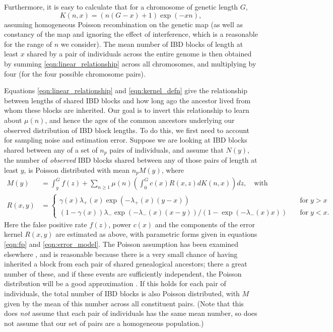 \documentclass{article}
\begin{document}
Furthermore, it is easy to calculate that for a chromosome of genetic length $G$, 
\begin{equation} \label{eqn:kernel_defn}
   K(n,x) = \left( n(G-x) + 1\right)\exp(-xn) ,
\end{equation}
assuming homogeneous Poisson recombination on the genetic map 
(as well as constancy of the map and ignoring the effect of interference, which is a reasonable for the range of $n$ we consider).
The mean number of IBD blocks of length at least $x$ shared by a pair of individuals
across the entire genome is then obtained by summing \eqref{eqn:linear_relationship} across all chromosomes,
and multiplying by four (for the four possible chromosome pairs).


Equations \eqref{eqn:linear_relationship} and \eqref{eqn:kernel_defn} give the relationship between lengths of shared IBD blocks 
and how long ago the ancestor lived from whom these blocks are inherited. 
Our goal is to invert this relationship to learn about $\mu(n)$,
and hence the ages of the common ancestors underlying our observed distribution of IBD block lengths.
To do this, 
we first need to account for sampling noise and estimation error.
Suppose we are looking at IBD blocks shared between any of a set of $n_p$ pairs of individuals,
and assume that $N(y)$, the number of {\em observed} IBD blocks shared between any of those pairs of length at least $y$, 
is Poisson distributed with mean $n_p M(y)$,
where
\begin{align} 
  M(y) &= \int_y^G f(z) + \sum_{n\ge1} \mu(n)  \left( \int_0^G c(x)R(x,z) dK(n,x) \right) dz , \quad \mbox{with}\label{eqn:error_relationship} \\
  R(x,y) &= \begin{cases} \gamma(x) \lambda_+(x) \exp(-\lambda_+(x) (y-x)) \quad &\mbox{for} \; y>x \\
    (1-\gamma(x)) \lambda_-\exp(-\lambda_-(x) (x-y)) / (1-\exp(-\lambda_-(x) x)) \quad &\mbox{for} \; y<x .  \end{cases} 
\end{align}
Here the false positive rate $f(z)$, power $c(x)$ and the components of the error kernel $R(x,y)$ are estimated as above,
with parametric forms given in equations \eqref{eqn:fp} and \eqref{eqn:error_model}.
The Poisson assumption has been examined elsewhere \citep[e.g.][]{fisher1954fuller,huff2011maximumlikelihood},
and is reasonable
because there is a very small chance of having inherited a block from each pair of shared genealogical ancestors;
there a great number of these, and if these events are sufficiently independent,
the Poisson distribution will be a good approximation \citep[see e.g.][]{grimmett2001probability}.
If this holds for each pair of individuals,
the total number of IBD blocks is also Poisson distributed,
with $M$ given by the mean of this number across all constituent pairs.
(Note that this does {\em not} assume that each pair of individuals
has the same mean number, so does not assume that our set of pairs
are a homogeneous population.)
\end{document}
